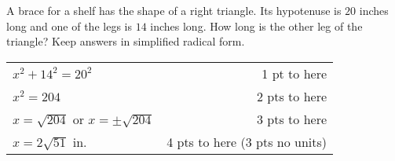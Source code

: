 {
	A brace for a shelf has the shape of a right triangle. Its hypotenuse is $20$ inches long and one of the legs is $14$ inches long. How long is the other leg of the triangle? Keep answers in simplified radical form.
}
{
	\begin{tabular}{l r}
	$x^2+14^2 = 20^2$ & 1 pt to here\\
	$x^2=204$ & 2 pts to here\\
	$x=\sqrt{204}$ or $x=\pm \sqrt{204}$ & 3 pts to here\\
	$x=2\sqrt{51}$ in. & 4 pts to here (3 pts no units)
	\end{tabular}
}
